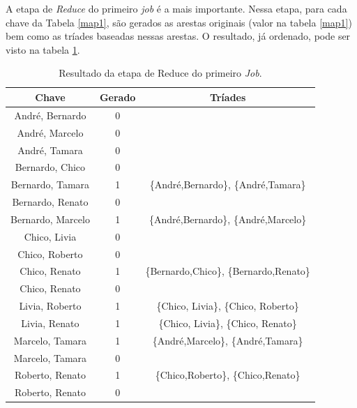 A etapa de \textit{Reduce} do primeiro \textit{job} é a mais importante. Nessa etapa, para cada chave 
da Tabela \ref{map1}, são gerados as arestas originais (valor na tabela \ref{map1}) bem como as tríades baseadas 
nessas arestas. O resultado, já ordenado, pode ser visto na tabela \ref{reduce1}.

\begin{table}[!htbp]
\centering
\caption{Resultado da etapa de Reduce do primeiro \textit{Job}.}
\label{reduce1}
\begin{tabular}{|c|c|c|}
\hline
{\bf Chave}       & {\bf Gerado} & {\bf Tríades}                           \\ \hline
André, Bernardo   & 0            &                                         \\ \hline
André, Marcelo    & 0            &                                         \\ \hline
André, Tamara     & 0            &                                         \\ \hline
Bernardo, Chico   & 0            &                                         \\ \hline
Bernardo, Tamara  & 1            & \{André,Bernardo\}, \{André,Tamara\}    \\ \hline
Bernardo, Renato  & 0            &                                         \\ \hline
Bernardo, Marcelo & 1            & \{André,Bernardo\}, \{André,Marcelo\}   \\ \hline
Chico, Livia      & 0            &                                         \\ \hline
Chico, Roberto    & 0            &                                         \\ \hline
Chico, Renato     & 1            & \{Bernardo,Chico\}, \{Bernardo,Renato\} \\ \hline
Chico, Renato     & 0            &                                         \\ \hline
Livia, Roberto    & 1            & \{Chico, Livia\}, \{Chico, Roberto\}    \\ \hline
Livia, Renato     & 1            & \{Chico, Livia\}, \{Chico, Renato\}     \\ \hline
Marcelo, Tamara   & 1            & \{André,Marcelo\}, \{André,Tamara\}     \\ \hline
Marcelo, Tamara   & 0            &                                         \\ \hline
Roberto, Renato   & 1            & \{Chico,Roberto\}, \{Chico,Renato\}     \\ \hline
Roberto, Renato   & 0            &                                         \\ \hline
\end{tabular}
\end{table}

